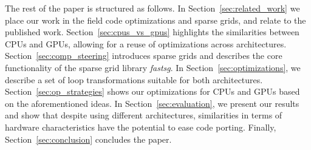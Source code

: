 The rest of the paper is structured as follows. In
Section~\ref{sec:related_work} we place our work in the field code optimizations
and sparse grids, and relate to the published work.
Section~\ref{sec:cpus_vs_gpus} highlights the similarities between CPUs and
GPUs, allowing for a reuse of optimizations across architectures.
Section~\ref{sec:comp_steering} introduces sparse grids and describes the core
functionality of the sparse grid library \textit{fastsg}. In
Section~\ref{sec:optimizations}, we describe a set of loop transformations
suitable for both architectures. Section~\ref{sec:op_strategies} shows our
optimizations for CPUs and GPUs based on the aforementioned ideas. In
Section~\ref{sec:evaluation}, we present our results and show that despite using
different architectures, similarities in terms of hardware characteristics have
the potential to ease code porting. Finally, Section~\ref{sec:conclusion}
concludes the paper.

